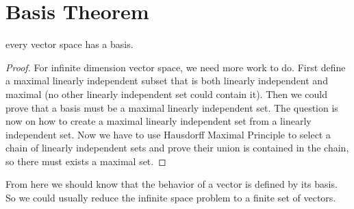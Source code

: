 \section{Basis Theorem}
\begin{theorem}
    every vector space has a basis.
\end{theorem}
\begin{proof}
    For infinite dimension vector space, we need more work to do. First define a maximal linearly independent subset that is both linearly independent and maximal (no other linearly independent set could contain it). Then we could prove that a basis must be a maximal linearly independent set. The question is now on how to create a maximal linearly independent set from a linearly independent set. Now we have to use Hausdorff Maximal Principle to select a chain of linearly independent sets and prove their union is contained in the chain, so there must exists a maximal set.
\end{proof}


From here we should know that the behavior of a vector is defined by its basis. So we could usually reduce the infinite space problem to a finite set of vectors.

















